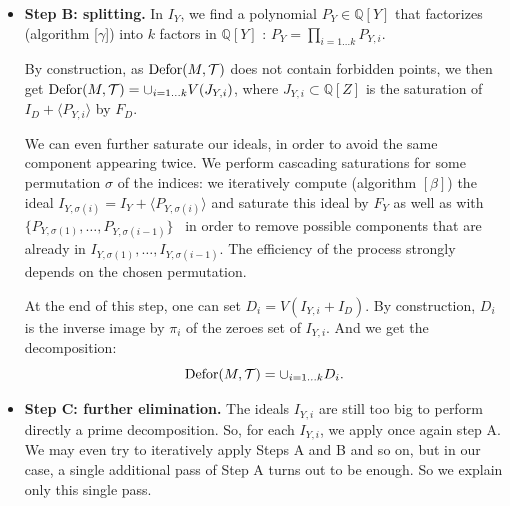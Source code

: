\begin{itemize}
Putting this in a diagram, we have :
\begin{center}
  \begin{tabular}{ccc}
    $\mathbb{C}^{12n}$ & $\rightarrow$ & $\mathbb{C}^{\sharp Y}$\\
    $\tmop{Defor} ( M, \mathcal{T} )$ & $\approx_{\pi_{Y}}$ & $V ( I_{Y} )
    \setminus ( \cup_{f \in F_{Y}} V ( f ) )$\\
    $( x,y )$ & $\rightarrow$ & $y$\\
    $\left( \frac{N_{x} ( y )}{D_{x} ( y )} ,y \right)$ & $\leftarrow$ & $y.$
  \end{tabular}
\end{center}
  \item {\bf Step B: splitting.} In $I_{Y}$, we find a polynomial
  $P_{Y} \in \mathbb{Q} [ Y ]$ that factorizes (algorithm [$\gamma$]) into
  $k$ factors in $\mathbb{Q} [ Y ]$ : $P_{Y} = \prod_{i=1 \ldots k} P_{Y,i}$.
  
  By construction, as $\tmop{Defor} ( M, \mathcal{T} )$ does not contain
  forbidden points, we then get $\operatorname{Defor} ( M, \mathcal{T} ) = \cup_{i=1
  \ldots k} V ( J_{Y,i} )$, where $J_{Y,i} \subset \mathbb{Q} [ Z ]$ is the
  saturation of $I_{D} + \langle P_{Y,i} \rangle$ by $F_{D}$.
  
  We can even further saturate our ideals, in order to avoid the same component appearing twice. We  perform cascading
  saturations  for some permutation $\sigma$ of the indices: we iteratively compute
  (algorithm $[ \beta ]$)  the ideal $I_{Y, \sigma ( i )} =I_{Y} + \langle
  P_{Y, \sigma ( i )} \rangle$ and saturate this ideal by $F_{Y}$ as well as
  with $\{ P_{Y, \sigma ( 1 )} , \ldots ,P_{Y, \sigma ( i-1 )} \}$ \ in order
  to remove possible components that are already in $I_{Y, \sigma ( 1 )} ,
  \ldots ,I_{Y, \sigma ( i-1 )}$. The efficiency of the process strongly
  depends on the chosen permutation.
  
At the end of this step, one can set $D_{i} =V ( I_{Y,i} +I_{D} )$. By construction, $D_i$ is the inverse image by $\pi_i$ of the zeroes set of $I_{Y,i}$. And we get the decomposition: 
$$\operatorname{Defor} ( M,
  \mathcal{T} ) = \cup_{i=1 \ldots k} D_{i}.$$
  
  \item {\bf Step C: further elimination.} The ideals $I_{Y,i}$ are still too big to perform 
  directly a prime decomposition. So, for each $I_{Y,i}$, we apply once again step A. We may 
  even try to iteratively apply Steps A and B and so on, but in our case, a single additional 
  pass of Step A turns out to be enough. So we explain only this single pass.
  

\end{itemize}
